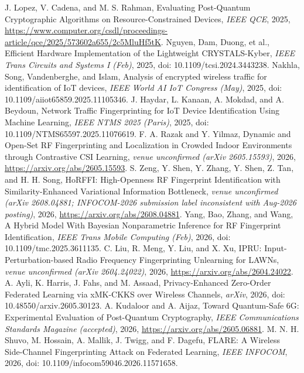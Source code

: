 J. Lopez, V. Cadena, and M. S. Rahman, Evaluating Post-Quantum Cryptographic Algorithms on Resource-Constrained Devices, \emph{IEEE QCE}, 2025, \url{https://www.computer.org/csdl/proceedings-article/qce/2025/573602a655/2c5MluHf5tK}.
Nguyen, Dam, Duong, et al., Efficient Hardware Implementation of the Lightweight CRYSTALS-Kyber, \emph{IEEE Trans Circuits and Systems I (Feb)}, 2025, doi: 10.1109/tcsi.2024.3443238.
Nakhla, Song, Vandenberghe, and Islam, Analysis of encrypted wireless traffic for identification of IoT devices, \emph{IEEE World AI IoT Congress (May)}, 2025, doi: 10.1109/aiiot65859.2025.11105346.
J. Haydar, L. Kanaan, A. Mokdad, and A. Beydoun, Network Traffic Fingerprinting for IoT Device Identification Using Machine Learning, \emph{IEEE NTMS 2025 (Paris)}, 2025, doi: 10.1109/NTMS65597.2025.11076619.
F. A. Razak and Y. Yilmaz, Dynamic and Open-Set RF Fingerprinting and Localization in Crowded Indoor Environments through Contrastive CSI Learning, \emph{venue unconfirmed (arXiv 2605.15593)}, 2026, \url{https://arxiv.org/abs/2605.15593}.
S. Zeng, Y. Shen, Y. Zhang, Y. Shen, Z. Tan, and H. H. Song, HoRFFI: High-Openness RF Fingerprint Identification with Similarity-Enhanced Variational Information Bottleneck, \emph{venue unconfirmed (arXiv 2608.04881; INFOCOM-2026 submission label inconsistent with Aug-2026 posting)}, 2026, \url{https://arxiv.org/abs/2608.04881}.
Yang, Bao, Zhang, and Wang, A Hybrid Model With Bayesian Nonparametric Inference for RF Fingerprint Identification, \emph{IEEE Trans Mobile Computing (Feb)}, 2026, doi: 10.1109/tmc.2025.3611135.
C. Liu, R. Meng, Y. Liu, and X. Xu, IPRU: Input-Perturbation-based Radio Frequency Fingerprinting Unlearning for LAWNs, \emph{venue unconfirmed (arXiv 2604.24022)}, 2026, \url{https://arxiv.org/abs/2604.24022}.
A. Ayli, K. Harris, J. Fahs, and M. Assaad, Privacy-Enhanced Zero-Order Federated Learning via xMK-CKKS over Wireless Channels, \emph{arXiv}, 2026, doi: 10.48550/arxiv.2605.30123.
A. Kudaloor and A. Aijaz, Toward Quantum-Safe 6G: Experimental Evaluation of Post-Quantum Cryptography, \emph{IEEE Communications Standards Magazine (accepted)}, 2026, \url{https://arxiv.org/abs/2605.06881}.
M. N. H. Shuvo, M. Hossain, A. Mallik, J. Twigg, and F. Dagefu, FLARE: A Wireless Side-Channel Fingerprinting Attack on Federated Learning, \emph{IEEE INFOCOM}, 2026, doi: 10.1109/infocom59046.2026.11571658.
